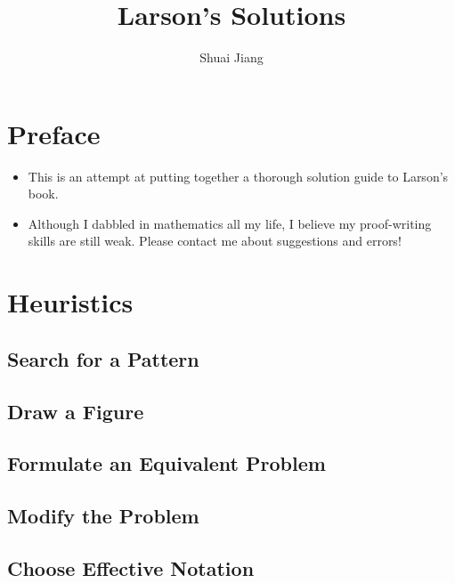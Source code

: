 \documentclass[11pt]{book} %
\title{Larson's Solutions}
\author{Shuai Jiang}
\begin{document}
\maketitle
\tableofcontents

\chapter*{Preface}
\begin{itemize}
	\item This is an attempt at putting together a thorough solution guide to Larson's book. 
	\item Although I dabbled in mathematics all my life, I believe my proof-writing skills are still weak. Please contact me about suggestions and errors! 
\end{itemize}

\chapter{Heuristics}
\section{Search for a Pattern}


\section{Draw a Figure}

\section{Formulate an Equivalent Problem}


\section{Modify the Problem}


\section{Choose Effective Notation}

\end{document}
